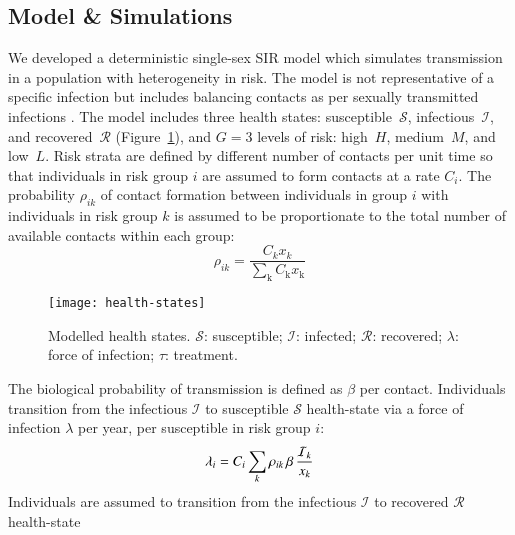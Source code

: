 \subsection{Model \& Simulations}\label{ss:model-sim}
We developed a deterministic single-sex SIR model
which simulates transmission in a population with heterogeneity in risk.
The model is not representative of a specific infection
but includes balancing contacts
as per sexually transmitted infections \citep{Garnett1994}.
The model includes three health states:
susceptible~$\mathcal{S}$, infectious~$\mathcal{I}$, and recovered~$\mathcal{R}$
(Figure~\ref{fig:health-states}),
and $G = 3$ levels of risk:
high~$H$, medium~$M$, and low~$L$.
Risk strata are defined by different number of contacts per unit time
so that individuals in risk group $i$ are assumed to
form contacts at a rate $C_{i}$.
The probability $\rho_{ik}$ of contact formation between individuals in group $i$
with individuals in risk group $k$ is assumed to be
proportionate to the total number of available contacts within each group:
\begin{equation}
  \rho_{ik} = \frac
    {C_k x_k}
    {\sum_{\mathrm{k}}C_{\mathrm{k}} x_{\mathrm{k}}}
    \label{eq:rho}
\end{equation}
\begin{figure}
  \centering
  \texttt{[image: health-states]}
  \caption{Modelled health states.
  $\mathcal{S}$: susceptible;
  $\mathcal{I}$: infected;
  $\mathcal{R}$: recovered;
  $\lambda$: force of infection;
  $\tau$: treatment.}
  \label{fig:health-states}
\end{figure}
\par
The biological probability of transmission is defined as $\beta$ per contact.
Individuals transition from the
infectious $\mathcal{I}$ to susceptible $\mathcal{S}$ health-state
via a force of infection $\lambda$ per year, per susceptible in risk group $i$:
\begin{equation}
  \lambda_{i} =
  C_{i} \sum_k \rho_{ik} \thinspace  \beta \thinspace \frac{\mathcal{I}_k}{x_k}
  \label{eq:foi}
\end{equation}
Individuals are assumed to transition from the
infectious $\mathcal{I}$ to recovered $\mathcal{R}$ health-state

